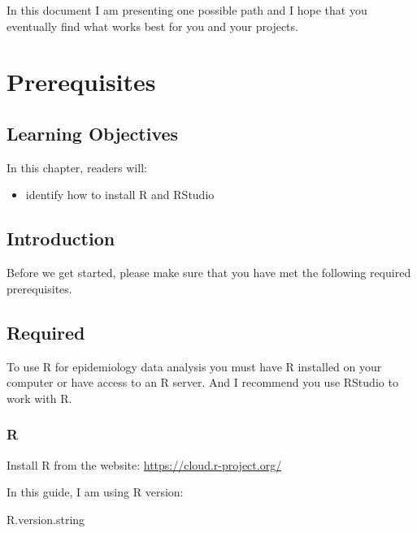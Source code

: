 \documentclass[
  letterpaper,
  DIV=11,
  numbers=noendperiod]{scrreprt}
\newenvironment{Shaded}{\begin{snugshade}}{\end{snugshade}}
\newcommand{\NormalTok}[1]{\textcolor[rgb]{0.00,0.23,0.31}{#1}}
\providecommand{\tightlist}{%
  \setlength{\itemsep}{0pt}\setlength{\parskip}{0pt}}\usepackage{longtable,booktabs,array}
\begin{document}
In this document I am presenting one possible path and I hope that you
eventually find what works best for you and your projects.


\hypertarget{prerequisites}{%
\chapter{Prerequisites}\label{prerequisites}}

\hypertarget{learning-objectives-1}{%
\section{Learning Objectives}\label{learning-objectives-1}}

In this chapter, readers will:

\begin{itemize}
\tightlist
\item
  identify how to install R and RStudio
\end{itemize}

\hypertarget{introduction-1}{%
\section{Introduction}\label{introduction-1}}

Before we get started, please make sure that you have met the following
required prerequisites.

\hypertarget{required}{%
\section{Required}\label{required}}

To use R for epidemiology data analysis you must have R installed on
your computer or have access to an R server. And I recommend you use
RStudio to work with R.

\hypertarget{r}{%
\subsection{R}\label{r}}

Install R from the website: \url{https://cloud.r-project.org/}

In this guide, I am using R version:

\begin{Shaded}
\begin{Highlighting}[]
\NormalTok{R.version.string}
\end{Highlighting}
\end{Shaded}
\end{document}
